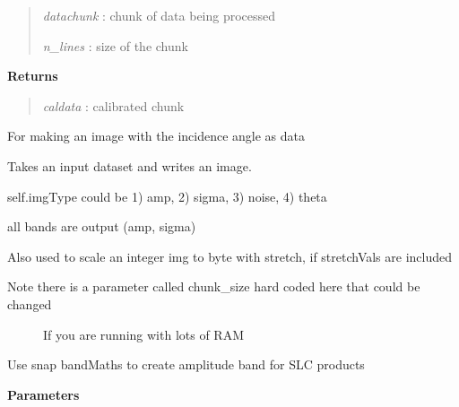 \documentclass[letterpaper,10pt,openany,oneside]{sphinxmanual}
\begin{document}
\begin{fulllineitems}
\begin{fulllineitems}
\begin{quote}
\emph{datachunk} : chunk of data being processed

\emph{n\_lines} : size of the chunk
\end{quote}

\textbf{Returns}
\begin{quote}

\emph{caldata} : calibrated chunk
\end{quote}

\end{fulllineitems}


\begin{fulllineitems}
\label{code:Image.Image.getTheta}
For making an image with the incidence angle as data

\end{fulllineitems}


\begin{fulllineitems}
\label{code:Image.Image.imgWrite}
Takes an input dataset and writes an image.

self.imgType could be 1) amp, 2) sigma, 3) noise, 4) theta

all bands are output (amp, sigma)

Also used to scale an integer img to byte with stretch, if stretchVals are included
\begin{description}
\item[{Note there is a parameter called chunk\_size hard coded here that could be changed }] \leavevmode
If you are running with lots of RAM

\end{description}

\end{fulllineitems}


\begin{fulllineitems}
\label{code:Image.Image.makeAmp}
Use snap bandMaths to create amplitude band for SLC products

\textbf{Parameters}
\begin{quote}


\end{quote}
\end{fulllineitems}
\end{fulllineitems}
\end{document}

